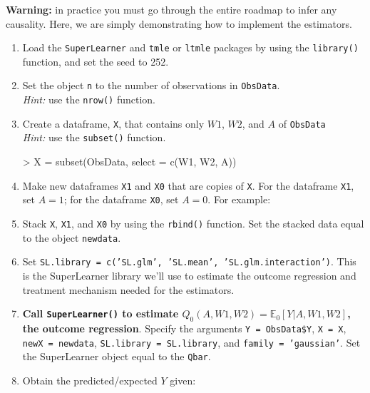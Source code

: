 \documentclass[answers]{exam}
\begin{document}
\noindent \textbf{Warning:} in practice you must go through the entire roadmap to infer any causality. Here, we are simply demonstrating how to implement the estimators.

\begin{enumerate}
\item Load the \texttt{SuperLearner} and \texttt{tmle} or \texttt{ltmle} packages by using the \texttt{library()} function, and set the seed to 252.
\item Set the object \texttt{n} to the number of observations in \texttt{ObsData}. \\
\textit{Hint:} use the \texttt{nrow()} function.
\item Create a dataframe, \texttt{X}, that contains only $W1$, $W2$, and $A$ of \texttt{ObsData} \\
\textit{Hint:} use the \texttt{subset()} function.
\begin{Schunk}
\begin{Sinput}
> X = subset(ObsData, select = c(W1, W2, A))
\end{Sinput}
\end{Schunk}
\item Make new dataframes \texttt{X1} and \texttt{X0} that are copies of \texttt{X}. For the dataframe \texttt{X1}, set $A = 1$; for the dataframe \texttt{X0}, set $A = 0$. For example:
\begin{Schunk}
\end{Schunk}
\item Stack \texttt{X}, \texttt{X1}, and \texttt{X0} by using the \texttt{rbind()} function. Set the stacked data equal to the object \texttt{newdata}.
\item Set \texttt{SL.library = c('SL.glm', 'SL.mean', 'SL.glm.interaction')}. This is the SuperLearner library we'll use to estimate the outcome regression and treatment mechanism needed for the estimators.
\item \textbf{Call \texttt{SuperLearner()} to estimate $Q_0(A,W1, W2) = \mathbb{E}_0[Y|A,W1,W2]$, the outcome regression}. Specify the arguments \texttt{Y = ObsData\$Y}, \texttt{X = X}, \texttt{newX = newdata}, \texttt{SL.library = SL.library}, and \texttt{family = 'gaussian'}. Set the SuperLearner object equal to the \texttt{Qbar}.
\item Obtain the predicted/expected $Y$ given: 
\begin{enumerate}

\end{enumerate}
\end{enumerate}
\end{document}
